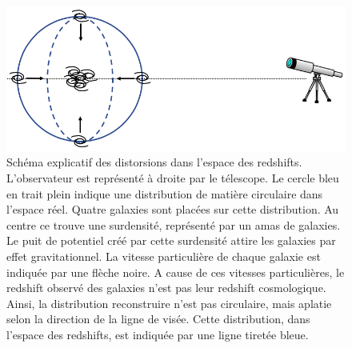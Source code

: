 \documentclass[11pt, twoside, a4paper, openright]{report}
\begin{document}
\begin{figure}
  \centering
  \includegraphics[scale=0.4]{schema_rsd}
  \caption{Schéma explicatif des distorsions dans l'espace des redshifts. L'observateur est représenté à droite par le télescope. Le cercle bleu en trait plein indique une distribution de matière circulaire dans l'espace réel. Quatre galaxies sont placées sur cette distribution. Au centre ce trouve une surdensité, représenté par un amas de galaxies. Le puit de potentiel créé par cette surdensité attire les galaxies par effet gravitationnel. La vitesse particulière de chaque galaxie est indiquée par une flèche noire. A cause de ces vitesses particulières, le redshift observé des galaxies n'est pas leur redshift cosmologique. Ainsi, la distribution reconstruire n'est pas circulaire, mais aplatie selon la direction de la ligne de visée. Cette distribution, dans l'espace des redshifts, est indiquée par une ligne tiretée bleue.}
  \label{fig:schema_rsd}
\end{figure}
\end{document}
